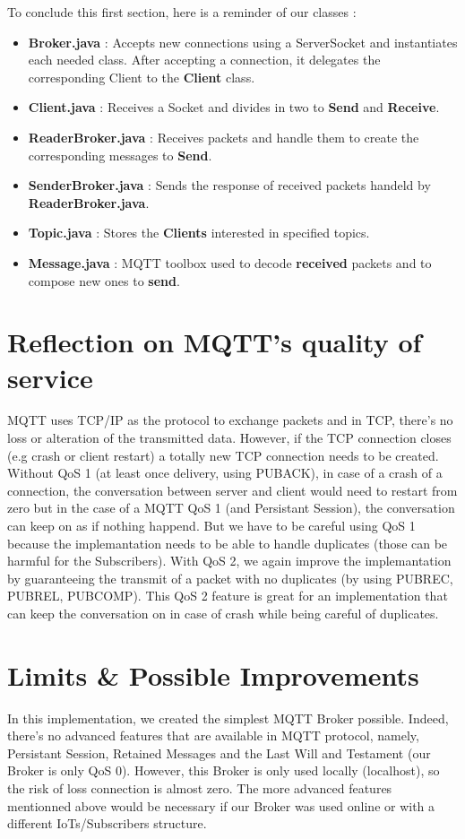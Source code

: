 \documentclass[12pt]{article}
\begin{document}
To conclude this first section, here is a reminder of our classes :
\begin{itemize}
	\item \textbf{Broker.java} : Accepts new connections using a ServerSocket and instantiates each needed class. After accepting a connection, it delegates 
	the corresponding Client to the \textbf{Client} class.
	\item \textbf{Client.java} : Receives a Socket and divides in two to \textbf{Send} and \textbf{Receive}.
	\item \textbf{ReaderBroker.java} : Receives packets and handle them to create the corresponding messages to \textbf{Send}.
	\item \textbf{SenderBroker.java} : Sends the response of received packets handeld by \textbf{ReaderBroker.java}.
	\item \textbf{Topic.java} : Stores the \textbf{Clients} interested in specified topics.
	\item \textbf{Message.java} : MQTT toolbox used to decode \textbf{received} packets and to compose new ones to \textbf{send}.
\end{itemize}

\section{Reflection on MQTT's quality of service}
MQTT uses TCP/IP as the protocol to exchange packets and in TCP, there's no loss or alteration of the transmitted data. However, if the TCP connection 
closes (e.g crash or client restart) a totally new TCP connection needs to be created. Without QoS 1 (at least once delivery, using PUBACK), in case of a crash of a connection, 
the conversation between server and client would need to restart from zero but in the case of a MQTT QoS 1 (and Persistant Session), the conversation can keep on as if nothing happend. But we have to be careful using QoS 1 because 
the implemantation needs to be able to handle duplicates (those can be harmful for the Subscribers). With QoS 2, we again improve the implemantation by guaranteeing the transmit of a packet with no duplicates (by using PUBREC, PUBREL, PUBCOMP). 
This QoS 2 feature is great for an implementation that can keep the conversation on in case of crash while being careful of duplicates.

\section{Limits \& Possible Improvements}
In this implementation, we created the simplest MQTT Broker possible. Indeed, there's no advanced features that are available in MQTT protocol, namely, Persistant Session, 
Retained Messages and the Last Will and Testament (our Broker is only QoS 0). However, this Broker is only used locally (localhost), so the risk of loss connection is almost zero. 
The more advanced features mentionned above would be necessary if our Broker was used online or with a different IoTs/Subscribers structure. 
\end{document}
